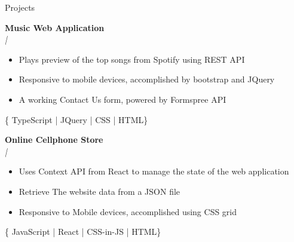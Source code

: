 \documentclass{resume} %
\newcommand{\sepspace}{\vspace*{1em}}           %
\begin{document}
\begin{rSection}{Projects}

        \textbf{Music Web Application} \\
        \textit{ |  }
        \begin{itemize}[noitemsep,topsep=-6pt]
          \item Plays preview of the top songs from Spotify using REST API
          \item Responsive to mobile devices, accomplished by bootstrap and JQuery
          \item A working Contact Us form, powered by Formspree API
        \end{itemize}
        \{ TypeScript | JQuery | CSS | HTML\}

        \textbf{Online Cellphone Store} \\
        \textit{ |  }
        \begin{itemize}[noitemsep,topsep=-6pt]
          \item Uses Context API from React to manage the state of the web application
          \item Retrieve The website data from a JSON file
          \item Responsive to Mobile devices, accomplished using CSS grid
        \end{itemize}
        \{ JavaScript | React | CSS-in-JS | HTML\}



\end{rSection}
\end{document}
